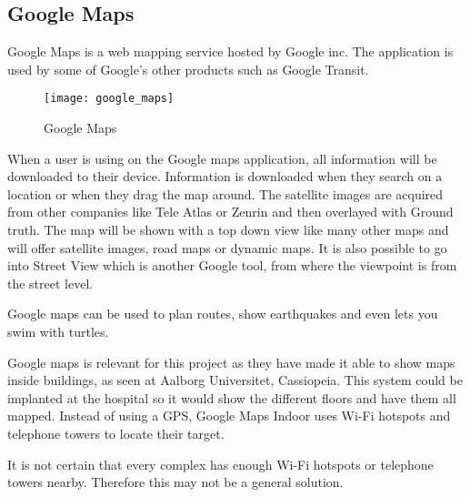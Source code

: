 \subsection{Google Maps}
Google Maps is a web mapping service hosted by Google inc. The application is used by some of Google's other products such as Google Transit\cite{Goo_transist}. 

\begin{figure}[ht!]
    \centering
    \texttt{[image: google\_maps]}
    \caption{Google Maps}
    \label{fig:google_maps}
  \end{figure}

When a user is using on the Google maps application, all information will be downloaded to their device. Information is downloaded when they search on a location or when they drag the map around\cite{Goo_input}. The satellite images are acquired from other companies like Tele Atlas\cite{Goo_Tele} or Zenrin\cite{Goo_Zenrin} and then overlayed with Ground truth\cite{Goo_GT}.
The map will be shown with a top down view like many other maps and will offer satellite images, road maps or dynamic maps. It is also possible to go into Street View which is another Google tool, from where the viewpoint is from the street level\cite{Goo_street}.

Google maps can be used to plan routes, show earthquakes and even lets you swim with turtles\cite{Goo_Turtle}.

Google maps is relevant for this project as they have made it able to show maps inside buildings, as seen at Aalborg Universitet, Cassiopeia\cite{Goo_Indoor1}. This system could be implanted at the hospital so it would show the different floors and have them all mapped. Instead of using a GPS, Google Maps Indoor uses Wi-Fi hotspots and telephone towers to locate their target\cite{Goo_Indoor}.

It is not certain that every complex has enough Wi-Fi hotspots or telephone towers nearby. Therefore this may not be a general solution.